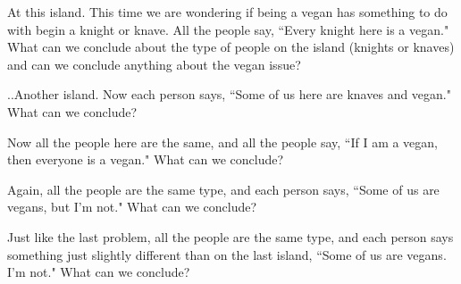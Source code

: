\begin{problem}
At this island. This time we are wondering if being a vegan has something to do with begin a knight or knave.  All the people say, ``Every knight here is a vegan."   What can we conclude about the type of people on the island (knights or knaves) and can we conclude anything about the vegan issue?
\end{problem}

\newpage
\begin{problem}
..Another island.  Now  each person says, ``Some of us here are knaves and vegan."  What can we conclude?
\end{problem}



\begin{problem}
Now all the people here are the same, and all the people say, ``If I am a vegan, then everyone is a vegan."   What can we conclude?
\end{problem}



\begin{problem}
Again, all the people are the same type, and each person says, ``Some of us are vegans, but I'm not."   What can we conclude?
\end{problem}

\begin{problem}
Just like the last problem, all the people are the same type, and each person says something just slightly different than on the last island, ``Some of us are vegans.  I'm not."   What can we conclude?
\end{problem}


